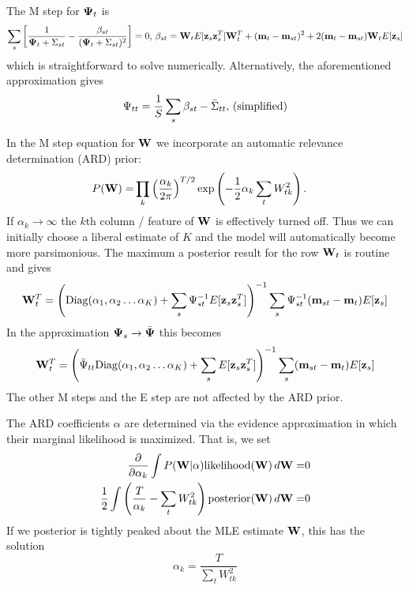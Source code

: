 \documentclass[nofootinbib,amssymb,amsmath]{revtex4}
\newcommand{\vz}{{\bf z}}
\newcommand{\vm}{{\bf m}}
\newcommand{\vW}{{\bf W}}
\newcommand{\vPsi}{{\bf \Psi}}
\begin{document}
The M step for $\vPsi_t$ is
\begin{align}
\sum_s \left[ \frac{1}{\vPsi_t + \Sigma_{st}} - \frac{\beta_{st}}{(\vPsi_t + \Sigma_{st})^2} \right] = 0, \, \beta_{st} = \vW_t  E[\vz_s \vz_s^T] \vW_t^T + (\vm_t - \vm_{st})^2 +2 (\vm_t - \vm_{st}) \vW_t E[\vz_s]
\end{align}
which is straightforward to solve numerically.  Alternatively, the aforementioned approximation gives
%
\begin{equation}
\Psi_{tt} = \frac{1}{S} \sum_s \beta_{st} - \bar{\Sigma}_{tt}, \, {\rm (simplified)}
\end{equation}
%

In the M step equation for $\vW$ we incorporate an automatic relevance determination (ARD) prior:
%
\begin{align}
P(\vW) =& \prod_k \left( \frac{\alpha_k}{2 \pi} \right)^{T/2} \exp \left( -\frac{1}{2} \alpha_k \sum_t W_{tk}^2  \right).
\end{align}
%
If $\alpha_k \rightarrow \infty$ the $k$th column / feature of $\vW$ is effectively turned off.  Thus we can initially choose a liberal estimate of $K$ and the model will automatically become more parsimonious.
The maximum a posterior result for the row $\vW_t$ is routine and gives
%
\begin{equation}
\vW_t^T = \left( {\rm Diag}(\alpha_1, \alpha_2 \ldots \alpha_K) + \sum_s \Psi_{st}^{-1}  E[\vz_{s} \vz_{s}^T]  \right)^{-1} \sum_s \Psi_{st}^{-1} ( \vm_{st} - \vm_t) E[\vz_{s}]
\label{M_step_W}
\end{equation}
%
In the approximation $\vPsi_s \rightarrow \bar{\vPsi}$ this becomes
%
\begin{equation}
\vW_t^T = \left( \bar{\Psi}_{tt} {\rm Diag}(\alpha_1, \alpha_2 \ldots \alpha_K) + \sum_s  E[\vz_{s} \vz_{s}^T]  \right)^{-1} \sum_s  ( \vm_{st} - \vm_t) E[\vz_{s}]
\label{M_step_W}
\end{equation}
%
The other M steps and the E step are not affected by the ARD prior.

The ARD coefficients $\alpha$ are determined via the evidence approximation in which their marginal likelihood is maximized.  That is, we set
\begin{align}
\frac{\partial}{\partial \alpha_k} \int P(\vW | \alpha) {\rm likelihood}(\vW) \, d \vW =& 0 \\
\frac{1}{2} \int \left( \frac{T}{\alpha_k} - \sum_t W_{tk}^2 \right) {\rm posterior}(\vW) \, d \vW =& 0 \\
\end{align}
If we posterior is tightly peaked about the MLE estimate $\vW$, this has the solution
\begin{equation}
\alpha_k = \frac{T}{\sum_t W_{tk}^2}
\end{equation}
\end{document}

